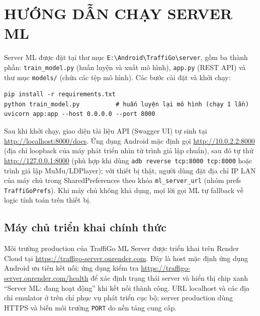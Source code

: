 \documentclass[12pt,a4paper]{report}
\begin{document}
\appendix
\chapter{HƯỚNG DẪN CHẠY SERVER ML}
Server ML được đặt tại thư mục \texttt{E:\textbackslash Android\textbackslash TraffiGo\textbackslash server}, gồm ba thành phần: \texttt{train\_model.py} (huấn luyện và xuất mô hình), \texttt{app.py} (REST API) và thư mục \texttt{models/} (chứa các tệp mô hình). Các bước cài đặt và khởi chạy:
\begin{verbatim}
pip install -r requirements.txt
python train_model.py          # huấn luyện lại mô hình (chạy 1 lần)
uvicorn app:app --host 0.0.0.0 --port 8000
\end{verbatim}
Sau khi khởi chạy, giao diện tài liệu API (Swagger UI) tự sinh tại \url{http://localhost:8000/docs}. Ứng dụng Android mặc định gọi \url{http://10.0.2.2:8000} (địa chỉ loopback của máy phát triển nhìn từ trình giả lập chuẩn), sau đó tự thử \url{http://127.0.0.1:8000} (phù hợp khi dùng \texttt{adb reverse tcp:8000 tcp:8000} hoặc trình giả lập MuMu/LDPlayer); với thiết bị thật, người dùng đặt địa chỉ IP LAN của máy chủ trong SharedPreferences theo khóa \texttt{ml\_server\_url} (nhóm prefs \texttt{TraffiGoPrefs}). Khi máy chủ không khả dụng, mọi lời gọi ML tự fallback về logic tính toán trên thiết bị.

\section*{Máy chủ triển khai chính thức}
Môi trường production của TraffiGo ML Server được triển khai trên Render Cloud tại \url{https://traffigo-server.onrender.com}. Đây là host mặc định ứng dụng Android ưu tiên kết nối; ứng dụng kiểm tra \url{https://traffigo-server.onrender.com/health} để xác định trạng thái server và hiển thị chip xanh ``Server ML: đang hoạt động'' khi kết nối thành công. URL localhost và các địa chỉ emulator ở trên chỉ phục vụ phát triển cục bộ; server production dùng HTTPS và biến môi trường \texttt{PORT} do nền tảng cung cấp.
\end{document}
